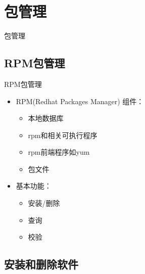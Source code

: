 \section{包管理}

\begin{frame}{包管理}

\tableofcontents[currentsection]
\end{frame} 

\subsection{RPM包管理}

\begin{frame}{RPM包管理}
\begin{itemize}
\item RPM(\alert{R}edhat \alert{P}ackages \alert{M}anager) 组件：

\begin{itemize}
\item 本地数据库
\item rpm和相关可执行程序
\item rpm前端程序如yum
\item 包文件
\end{itemize}
\item 基本功能：

\begin{itemize}
\item 安装/删除
\item 查询
\item 校验
\end{itemize}
\end{itemize}
\end{frame} 

\subsection{安装和删除软件}



